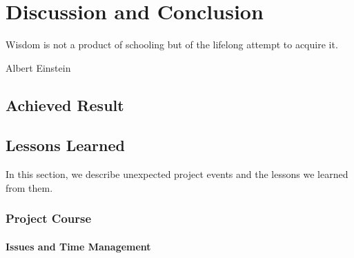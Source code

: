 \chapter{Discussion and Conclusion}
\epigraph{Wisdom is not a product of schooling but of the lifelong attempt to acquire it.}{Albert Einstein}
\section{Achieved Result}




\section{Lessons Learned}

In this section, we describe unexpected project events and the lessons we learned from them.

\subsection{Project Course}

\subsubsection{Issues and Time Management}

